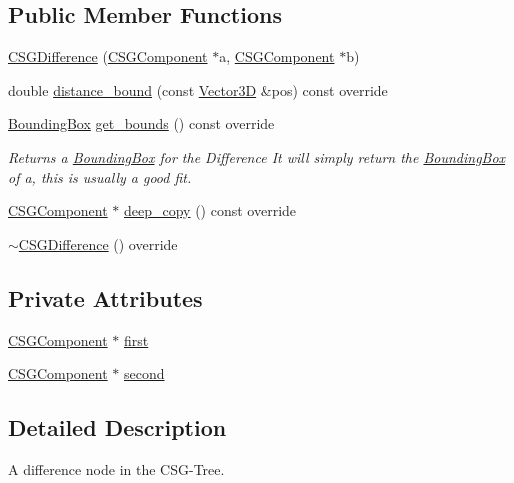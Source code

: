 \subsection*{Public Member Functions}
\begin{DoxyCompactItemize}
\item 
\hyperlink{classCSGDifference_ac8012afd2f29b2546ce9b302c491fa42}{C\+S\+G\+Difference} (\hyperlink{classCSGComponent}{C\+S\+G\+Component} $\ast$a, \hyperlink{classCSGComponent}{C\+S\+G\+Component} $\ast$b)
\item 
double \hyperlink{classCSGDifference_a66e0be492572f75b508a77c429be8fd8}{distance\+\_\+bound} (const \hyperlink{classVector3D}{Vector3D} \&pos) const override
\item 
\hyperlink{classBoundingBox}{Bounding\+Box} \hyperlink{classCSGDifference_aede15cd9fd46e4824e66361eb2f28ec9}{get\+\_\+bounds} () const override
\begin{DoxyCompactList}\small\item\em Returns a \hyperlink{classBoundingBox}{Bounding\+Box} for the Difference It will simply return the \hyperlink{classBoundingBox}{Bounding\+Box} of a, this is usually a good fit. \end{DoxyCompactList}\item 
\hyperlink{classCSGComponent}{C\+S\+G\+Component} $\ast$ \hyperlink{classCSGDifference_a8ea1d4cd7fc1ff6adca5cc4983eecfcd}{deep\+\_\+copy} () const override
\item 
\hyperlink{classCSGDifference_a1f1c435a8b85ee53ee5003548e465b75}{$\sim$\+C\+S\+G\+Difference} () override
\end{DoxyCompactItemize}
\subsection*{Private Attributes}
\begin{DoxyCompactItemize}
\item 
\hyperlink{classCSGComponent}{C\+S\+G\+Component} $\ast$ \hyperlink{classCSGDifference_a689a622e9b4c43d72575cbbdd2ad847b}{first}
\item 
\hyperlink{classCSGComponent}{C\+S\+G\+Component} $\ast$ \hyperlink{classCSGDifference_ae9b4b0b0839d066ce30006d99536cd99}{second}
\end{DoxyCompactItemize}


\subsection{Detailed Description}
A difference node in the C\+S\+G-\/\+Tree. 

